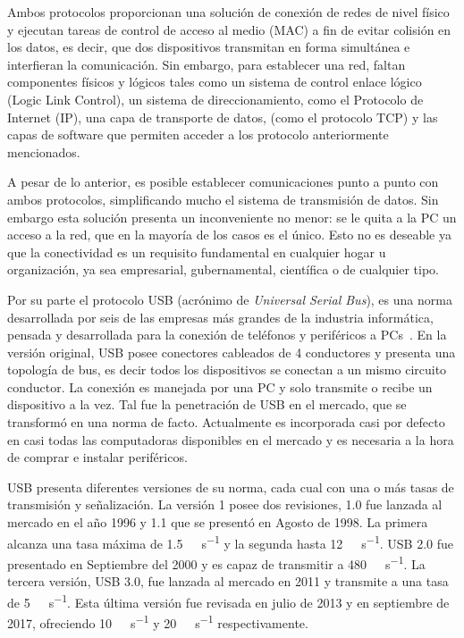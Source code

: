 Ambos protocolos proporcionan una solución de conexión de redes de nivel físico y ejecutan tareas de control de acceso al medio (MAC) a fin de evitar colisión en los datos, es decir, que dos dispositivos transmitan en forma simultánea e interfieran la comunicación.
Sin embargo, para establecer una red, faltan componentes físicos y lógicos tales como un sistema de control enlace lógico (Logic Link Control), un sistema de direccionamiento, como el Protocolo de Internet (IP), una capa de transporte de datos, (como el protocolo TCP) y las capas de software que permiten acceder a los protocolo anteriormente mencionados.%

A pesar de lo anterior, es posible establecer comunicaciones punto a punto con ambos protocolos, simplificando mucho el sistema de transmisión de datos. Sin embargo esta solución presenta un inconveniente no menor: se le quita a la PC un acceso a la red, que en la mayoría de los casos es el único. Esto no es deseable ya que la conectividad es un requisito fundamental en cualquier hogar u organización, ya sea empresarial, gubernamental, científica o de cualquier tipo.%

Por su parte el protocolo USB (acrónimo de {\it Universal Serial Bus}), es una norma desarrollada por seis de las empresas más grandes de la industria informática, pensada y desarrollada para la conexión de teléfonos y periféricos a PCs~\cite{USBspec}. En la versión original, USB posee conectores cableados de 4 conductores y presenta una topología de bus, es decir todos los dispositivos se conectan a un mismo circuito conductor. La conexión es manejada por una PC y solo transmite o recibe un dispositivo a la vez. Tal fue la penetración de USB en el mercado, que se transformó en una norma de facto. Actualmente es incorporada casi por defecto en casi todas las computadoras disponibles en el mercado y es necesaria a la hora de comprar e instalar periféricos.%

USB presenta diferentes versiones de su norma, cada cual con una o más tasas de transmisión y señalización. La versión 1 posee dos revisiones, 1.0 fue lanzada al mercado en el año 1996 y 1.1 que se presentó en Agosto de 1998. La primera alcanza una tasa máxima de \SI{1.5}{\mega\bit\per\second} y la segunda hasta \SI{12}{\mega\bit\per\second}. USB 2.0 fue presentado en Septiembre del 2000 y es capaz de transmitir a \SI{480}{\mega\bit\per\second}. La tercera versión, USB 3.0, fue lanzada al mercado en 2011 y transmite a una tasa de \SI{5}{\giga\bit\per\second}. Esta última versión fue revisada en julio de 2013 y en septiembre de 2017, ofreciendo \SI{10}{\giga\bit\per\second} y \SI{20}{\giga\bit\per\second} respectivamente.%

